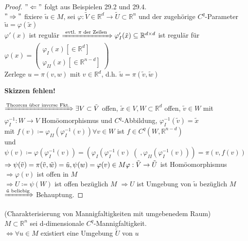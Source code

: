 \begin{proof}

$"\Leftarrow"$ folgt aus Beispielen 29.2 und 29.4. \\
$"\Rightarrow"$ fixiere $\tilde{u} \in M $, sei $\varphi : \tilde{V} \in \mathbb{R}^d
\rightarrow \tilde{U} \subset \mathbb{R}^n $ und der zugehörige $C^q$-Parameter 
$\tilde{u} = \varphi (\tilde{x})$ \\
$\varphi' (x)$ ist regulär $\xRightarrow{\text{ evtl. $\pi$ der Zeilen }} \varphi_I ' 
(\tilde{x}) \subseteq \mathbb{R}^{d \times d} $ ist regulär für $\varphi (x) =
    \begin{pmatrix}
    \varphi_I (x) \left[ \in \mathbb{R}^d \right]\\
    \varphi_{II} (x) \left[ \in \mathbb{R}^{n-d} \right]
    \end{pmatrix}
$ \\
Zerlege $u = \pi (v,w) $ mit $v \in \mathbb{R}^d $, 
d.h. $\tilde{u} = \pi (\tilde{v},\tilde{w})$

\textbf{Skizzen fehlen!}

$\xRightarrow{\text{Theorem über inverse Fkt.}} \exists V \subset \tilde{V} $ offen,
$\tilde{x} \in V, W \subset \mathbb{R}^d $ offen, $\tilde{v} \in W $
mit $\varphi_I ^{-1} : W \rightarrow V $ Homöomorphismus und $C^q$-Abbildung,
$\varphi_I ^{-1} (\tilde{v}) = \tilde{x} $ \\
mit $f(v) \coloneqq \varphi_{II} \left(\varphi_I ^{-1} (v)\right) \forall v \in W $ ist 
$f \in C^q \left(W, \mathbb{R}^{n-d}\right) $ \\
und $\psi (v) \coloneqq \varphi \left(\varphi_I ^{-1} (v) \right) =
\left( \varphi_I \left(\varphi_I ^{-1} (v) \right( ,
\varphi_{II} \left(\varphi_I ^ {-1} (v) \right) \right) = \pi \left(v, f(v)\right) $ \\
$\Rightarrow \psi (\tilde{v}) = \pi (\tilde{v}, \tilde{w}) = \tilde{u},
\psi (w) = \varphi (v) \in M \\
\varphi : \tilde{V} \rightarrow \tilde{U} $ ist Homöomorphismus \\
$\Rightarrow \varphi (v) $ ist offen in $M$ \\
$ \Rightarrow U \coloneqq \psi (W) $ ist offen bezüglich $M$
$\Rightarrow U $ ist Umgebung von $\tilde{u} $ bezüglich $M$ \\
$\xRightarrow{\tilde{u} \text{ beliebig}} $ Behauptung. 

\end{proof}

\begin{sa}
(Charakterisierung von Mannigfaltigkeiten mit umgebenedem Raum) \\
$M \subset \mathbb{R}^n $ sei d-dimensionale $C^q$-Mannigfaltigkeit. \\
$\Leftrightarrow \forall u \in M $ existiert eine Umgebung $\tilde{U}$ von $u$ 

\end{sa}
